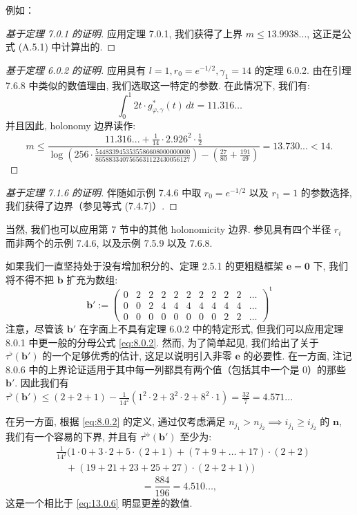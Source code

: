 例如：

\begin{proof}[基于定理 7.0.1 的证明]
应用定理 7.0.1, 我们获得了上界 \(m \le 13.9938...\), 这正是公式 (A.5.1) 中计算出的.
\end{proof}

\begin{proof}[基于定理 6.0.2 的证明]
应用具有 \(l=1, r_0=e^{-1/2}, \gamma_1=14\) 的定理 6.0.2. 
由在引理 7.6.8 中类似的数值理由, 我们选取这一特定的参数. 
在此情况下, 我们有:
\[ \int_0^1 2t \cdot g_{\varphi, \gamma}^*(t) \, dt = 11.316 \dots \]
并且因此, holonomy 边界读作:
\[ m \le \frac{11.316... + \frac{1}{14} \cdot 2.926^2 \cdot \frac{1}{2}}{\log\left(256 \cdot \frac{5448339453535586608000000000}{8658833407565631122430056127}\right) - \left(\frac{27}{80} + \frac{191}{49}\right)} = 13.730... < 14. \]
\end{proof}

\begin{proof}[基于定理 7.1.6 的证明]
伴随如示例 7.4.6 中取 \(r_0 = e^{-1/2}\) 以及 \(r_1 = 1\) 的参数选择, 我们获得了边界（参见等式 (7.4.7)）.
\end{proof}

当然, 我们也可以应用第 7 节中的其他 holonomicity 边界. 
参见具有四个半径 \(r_i\) 而非两个的示例 7.4.6, 以及示例 7.5.9 以及 7.6.8.

\begin{remark}\label{rem:13.0.7}
如果我们一直坚持处于没有增加积分的、定理 2.5.1 的更粗糙框架 \(\mathbf{e} = \mathbf{0}\) 下, 
我们将不得不把 \(\mathbf{b}\) 扩充为数组:
\begin{equation}\label{eq:13.0.8}
\mathbf{b}' := \begin{pmatrix} 
0 & 2 & 2 & 2 & 2 & 2 & 2 & 2 & 2 & 2 & \dots \\ 
0 & 0 & 2 & 4 & 4 & 4 & 4 & 4 & 4 & 4 & \dots \\
0 & 0 & 0 & 0 & 0 & 0 & 0 & 0 & 2 & 2 & \dots
\end{pmatrix}^{\mathrm{t}}
\end{equation}
注意，尽管该 \(\mathbf{b}'\) 在字面上不具有定理 6.0.2 中的特定形式, 
但我们可以应用定理 8.0.1 中更一般的分母公式 \eqref{eq:8.0.2}. 
然而, 为了简单起见, 我们给出了关于 \(\tau^{\flat}(\mathbf{b}')\) 的一个足够优秀的估计, 
这足以说明引入非零 \(\mathbf{e}\) 的必要性. 
在一方面, 注记 8.0.6 中的上界论证适用于其中每一列都具有两个值（包括其中一个是 0）的那些 \(\mathbf{b}'\). 
因此我们有 \(\tau^{\flat}(\mathbf{b}') \leq (2+2+1) - \frac{1}{14^2}(1^2 \cdot 2 + 3^2 \cdot 2 + 8^2 \cdot 1) = \frac{32}{7} = 4.571...\)

在另一方面, 根据 \eqref{eq:8.0.2} 的定义, 
通过仅考虑满足 \(n_{j_1} > n_{j_2} \implies i_{j_1} \ge i_{j_2}\) 的 \(\mathbf{n}\), 我们有一个容易的下界, 
并且有 \(\tau^{\flat\flat}(\mathbf{b}')\) 至少为:
\[
\begin{aligned}
&\frac{1}{14^2} \Big( 1 \cdot 0 + 3 \cdot 2 + 5 \cdot (2 + 1) + (7 + 9 + \dots + 17) \cdot (2 + 2) \\
&\quad + (19 + 21 + 23 + 25 + 27) \cdot (2 + 2 + 1) \Big)
\end{aligned}
\]
\[ = \frac{884}{196} = 4.510\dots, \]
这是一个相比于 \eqref{eq:13.0.6} 明显更差的数值. \end{remark}